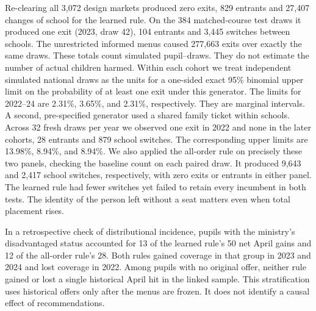 Re-clearing all 3,072 design markets produced zero exits, 829 entrants and 27,407 changes of school for the learned rule. On the 384 matched-course test draws it produced one exit (2023, draw 42), 104 entrants and 3,445 switches between schools. The unrestricted informed menus caused 277,663 exits over exactly the same draws. These totals count simulated pupil--draws. They do not estimate the number of actual children harmed. Within each cohort we treat independent simulated national draws as the units for a one-sided exact 95\% binomial upper limit on the probability of at least one exit under this generator. The limits for 2022--24 are 2.31\%, 3.65\%, and 2.31\%, respectively. They are marginal intervals. A second, pre-specified generator used a shared family ticket within schools. Across 32 fresh draws per year we observed one exit in 2022 and none in the later cohorts, 28 entrants and 879 school switches. The corresponding upper limits are 13.98\%, 8.94\%, and 8.94\%. We also applied the all-order rule on precisely these two panels, checking the baseline count on each paired draw. It produced 9,643 and 2,417 school switches, respectively, with zero exits or entrants in either panel. The learned rule had fewer switches yet failed to retain every incumbent in both tests. The identity of the person left without a seat matters even when total placement rises.

In a retrospective check of distributional incidence, pupils with the ministry's disadvantaged status accounted for 13 of the learned rule's 50 net April gains and 12 of the all-order rule's 28. Both rules gained coverage in that group in 2023 and 2024 and lost coverage in 2022. Among pupils with no original offer, neither rule gained or lost a single historical April hit in the linked sample. This stratification uses historical offers only after the menus are frozen. It does not identify a causal effect of recommendations.
